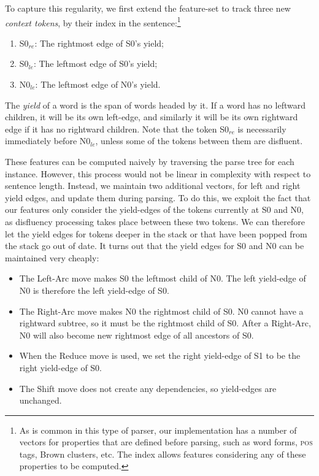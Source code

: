 \documentclass[11pt,letterpaper]{article}
\newcommand{\szero}{S0\xspace}
\newcommand{\nzero}{N0\xspace}
\newcommand{\szeroRedge}{S0$_{re}$\xspace}
\newcommand{\szeroLedge}{S0$_{le}$\xspace}
\newcommand{\nzeroLedge}{N0$_{le}$\xspace}
\begin{document}
To capture this regularity, we first extend the feature-set to track three new
\emph{context tokens}, by their index in the sentence:\footnote{As is common
in this type of parser, our implementation has a number of vectors for properties
that are defined before parsing, such as word forms, \textsc{pos} tags, Brown
clusters, etc. The index allows features considering any of these
properties to be computed.}
\begin{enumerate}
    \item \szeroRedge : The rightmost edge of \szero 's yield;
    \item \szeroLedge : The leftmost edge of \szero 's yield;
    \item \nzeroLedge : The leftmost edge of \nzero 's yield.
\end{enumerate}

The \emph{yield} of a word is the span of words headed by it.  If a word has
no leftward children, it will be its own left-edge, and similarly it will be
its own rightward edge if it has no rightward children. Note that the token
\szeroRedge is necessarily immediately before \nzeroLedge, unless some of the
tokens between them are disfluent.

These features can be computed naively by traversing the parse tree for each
instance. However, this process would not be linear in complexity with respect
to sentence length.  Instead, we maintain two additional vectors, for left
and right yield edges, and update them during parsing.  To do this, we exploit
the fact that our features only consider the yield-edges of the tokens currently
at S0 and N0, as disfluency processing takes place between these two tokens.
We can therefore let the yield edges for tokens deeper in the stack
or that have been popped from the stack go out of date.  It turns out that the
yield edges for S0 and N0 can be maintained very cheaply:

\begin{itemize}
\item The Left-Arc move makes \szero the leftmost child of \nzero. The left yield-edge of
\nzero is therefore the left yield-edge of \szero.
\item The Right-Arc move makes \nzero the rightmost child of \szero. \nzero cannot have a rightward subtree, so it must
be the rightmost child of \szero. After a Right-Arc, \nzero will also become
new rightmost edge of all ancestors of \szero.
\item When the Reduce move is used, we set the right yield-edge of S1 to be the
      right yield-edge of \szero.
\item The Shift move does not create any dependencies, so yield-edges are unchanged.
\end{itemize}
\end{document}
